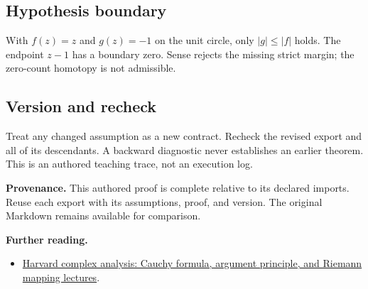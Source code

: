 \documentclass[preprint,12pt,aps,pra,showkeys,amsmath,amssymb,superscriptaddress,floatfix]{revtex4-2}
\theoremstyle{definition}
\theoremstyle{remark}
\providecommand{\tightlist}{\setlength{\itemsep}{2pt}\setlength{\parskip}{0pt}}
\begin{document}
\subsection{Hypothesis boundary}
With \(f(z)=z\) and \(g(z)=-1\) on the unit circle, only \(|g|\le |f|\)
holds. The endpoint \(z-1\) has a boundary zero. Sense rejects the
missing strict margin; the zero-count homotopy is not admissible.

\subsection{Version and recheck}
Treat any changed assumption as a new contract. Recheck the revised
export and all of its descendants. A backward diagnostic never
establishes an earlier theorem. This is an authored teaching trace, not
an execution log.

\par\medskip\begingroup\small\linespread{1.0}\selectfont\noindent\textbf{Provenance.} This authored proof is complete relative to its declared imports. Reuse
each export with its assumptions, proof, and version. The original
Markdown remains available for comparison.
\par\endgroup

\par\smallskip\begingroup\small\linespread{1.0}\selectfont\noindent\textbf{Further reading.} \begin{itemize}
\tightlist
\item
  \href{https://people.math.harvard.edu/~siu/math113/}{Harvard complex
  analysis: Cauchy formula, argument principle, and Riemann mapping
  lectures}.
\end{itemize}\par\endgroup
\end{document}
